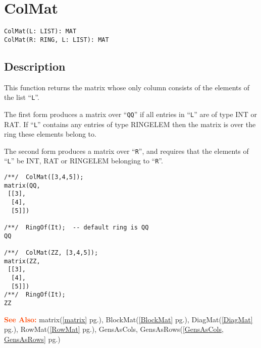 \documentclass[a4paper]{mybook}
\newenvironment{command}{}{} %
\newcommand\SeeAlso{\par\textcolor{OrangeRed}{\textbf{\large See Also: }}}
\begin{document}
\section{ColMat}
\label{ColMat}
\begin{command} %


\begin{Verbatim}[label=syntax, rulecolor=\color{MidnightBlue},
frame=single]
ColMat(L: LIST): MAT
ColMat(R: RING, L: LIST): MAT
\end{Verbatim}


\subsection*{Description}

This function returns the matrix whose only column consists of the
elements of the list ``\verb&L&''.
\par 
The first form produces a matrix over ``\verb&QQ&'' if all entries in
``\verb&L&'' are of type INT or RAT.  If ``\verb&L&'' contains any entries
of type RINGELEM then the matrix is over the ring these elements
belong to.
\par 
The second form produces a matrix over ``\verb&R&'', and requires that
the elements of ``\verb&L&'' be INT, RAT or RINGELEM belonging to ``\verb&R&''.
\begin{Verbatim}[label=example, rulecolor=\color{PineGreen}, frame=single]
/**/  ColMat([3,4,5]);
matrix(QQ,
 [[3],
  [4],
  [5]])

/**/  RingOf(It);  -- default ring is QQ
QQ

/**/  ColMat(ZZ, [3,4,5]);
matrix(ZZ,
 [[3],
  [4],
  [5]])
/**/  RingOf(It);
ZZ
\end{Verbatim}


\SeeAlso %
  matrix(\ref{matrix} pg.\pageref{matrix}), 
    BlockMat(\ref{BlockMat} pg.\pageref{BlockMat}), 
    DiagMat(\ref{DiagMat} pg.\pageref{DiagMat}), 
    RowMat(\ref{RowMat} pg.\pageref{RowMat}), 
    GensAsCols, GensAsRows(\ref{GensAsCols, GensAsRows} pg.\pageref{GensAsCols, GensAsRows})
\end{command} %
\end{document}
